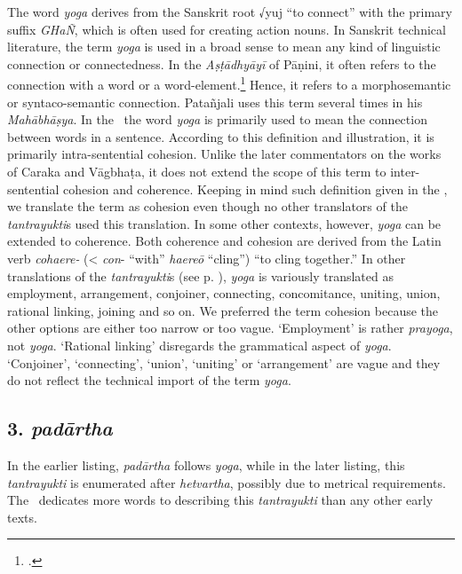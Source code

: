 The word \emph{yoga} derives from the Sanskrit root √yuj “to connect” with the primary suffix \emph{GHaÑ}, which is often used for creating action nouns. In Sanskrit technical literature, the term \emph{yoga} is used in a broad sense to mean any kind of linguistic connection or connectedness. In the \emph{Aṣṭādhyāyī} of Pāṇini, it often refers to the connection with a word or a word-element.\footnote{\cite[64]{josh-1991}.} Hence, it refers to a morphosemantic or syntaco-semantic connection. Patañjali uses this term several times in his \emph{Mahābhāṣya}. In the \SS\, the word \emph{yoga} is primarily used to mean the connection between words in a sentence. According to this definition and illustration, it is primarily intra-sentential cohesion. Unlike the later commentators on the works of Caraka and Vāgbhaṭa, it does not extend the scope of this term to inter-sentential cohesion and coherence. Keeping in mind such definition given in the \SS, we translate the term as cohesion even though no other translators of the \emph{tantrayukti}s used this translation. In some other contexts, however, \emph{yoga} can be extended to coherence. Both coherence and cohesion are derived from the Latin verb \emph{cohaere-} (< \emph{con}- “with” \emph{haereō} “cling”) “to cling together.”  In other translations of the \emph{tantrayukti}s (see p. \pageref{tantra-trans}), \emph{yoga} is variously translated as employment, arrangement, conjoiner, connecting, concomitance, uniting, union, rational linking, joining and so on. We preferred the term cohesion because the other options are either too narrow or too vague. `Employment' is rather \emph{prayoga}, not \emph{yoga}. `Rational linking' disregards the grammatical aspect of \emph{yoga}. `Conjoiner', `connecting', `union', `uniting' or `arrangement' are vague and they do not reflect the technical import of the term \emph{yoga}.

\subsection{3. \emph{padārtha}}

In the earlier listing, \emph{padārtha} follows \emph{yoga}, while in the later listing, this \emph{tantrayukti} is enumerated after \emph{hetvartha}, possibly due to metrical requirements. The \SS\ dedicates more words to describing this \emph{tantrayukti} than any other early texts.

